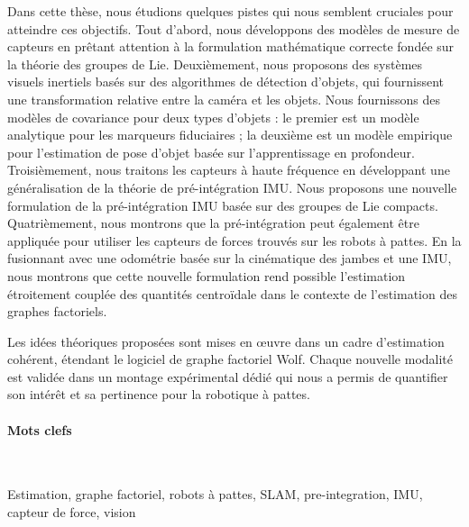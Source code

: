 Dans cette thèse, nous étudions quelques pistes qui nous semblent cruciales pour atteindre ces objectifs. Tout d'abord, nous développons des modèles de mesure de 
capteurs en prêtant attention à la formulation mathématique correcte fondée sur la théorie des groupes de Lie.
Deuxièmement, nous proposons des systèmes visuels inertiels basés sur des algorithmes de détection d'objets, qui fournissent une transformation relative entre la caméra 
et les objets.
Nous fournissons des modèles de covariance pour deux types d'objets : le premier est un modèle analytique pour les marqueurs fiduciaires ; la deuxième
est un modèle empirique pour l'estimation de pose d'objet basée sur l'apprentissage en profondeur.
Troisièmement, nous traitons les capteurs à haute fréquence en développant une généralisation de la théorie de pré-intégration IMU. Nous proposons une nouvelle 
formulation de la pré-intégration IMU basée sur des groupes de Lie compacts.
Quatrièmement, nous montrons que la pré-intégration peut également être appliquée pour utiliser les capteurs de forces trouvés sur les robots à pattes.
En la fusionnant avec une odométrie basée sur la cinématique des jambes et une IMU, nous montrons que cette nouvelle formulation rend possible l'estimation 
étroitement couplée des quantités centroïdale dans le contexte de l'estimation des graphes factoriels.

Les idées théoriques proposées sont mises en œuvre dans un cadre d'estimation cohérent, étendant le logiciel de graphe factoriel Wolf. 
Chaque nouvelle modalité est validée dans un montage expérimental dédié qui nous a permis de quantifier son intérêt et sa pertinence pour la robotique à pattes.


\paragraph{Mots clefs} ~

Estimation, graphe factoriel, robots à pattes, SLAM, pre-integration, IMU, capteur de force, vision 


\noindent\makebox[\linewidth]{\rule{0.6\textwidth}{2pt}}

\normalsize